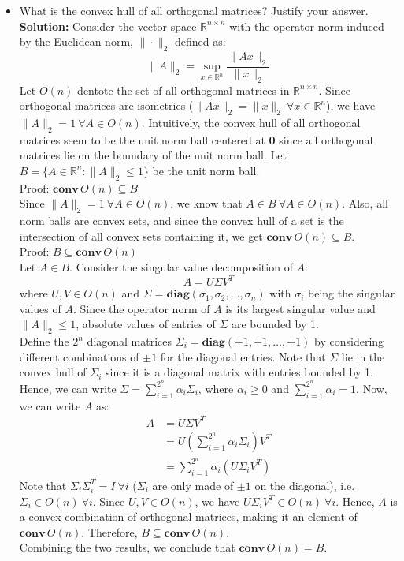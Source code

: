 \documentclass{article}
\begin{document}
\begin{itemize}
  Hence, we conclude that $\mathbf{conv} \, S = B_1$.
  
  \item[(b)] What is the convex hull of all orthogonal matrices? Justify your answer. \\
  
  \textbf{Solution:} Consider the vector space $\mathbb{R}^{n \times n}$ with the operator norm induced by the Euclidean norm, $\|\cdot\|_2$ defined as:
  \[ \|A\|_2 = \sup_{x \in \mathbb{R}^n} \frac{\|Ax\|_2}{\|x\|_2} \]
  Let $O(n)$ dentote the set of all orthogonal matrices in $\mathbb{R}^{n \times n}$. Since orthogonal matrices are isometries ($\|Ax\|_2 = \|x\|_2 ~ \forall x \in \mathbb{R}^n$), we have $\|A\|_2 = 1 ~ \forall A \in O(n)$. Intuitively, the convex hull of all orthogonal matrices seem to be the unit norm ball centered at \textbf{0} since all orthogonal matrices lie on the boundary of the unit norm ball. Let $B = \{A \in \mathbb{R}^n : \|A\|_2 \le 1\}$ be the unit norm ball. \\

  Proof: $\mathbf{conv} \, O(n) \subseteq B$ \\
  Since $\|A\|_2 = 1 ~ \forall A \in O(n)$, we know that $A \in B ~ \forall A \in O(n)$. Also, all norm balls are convex sets, and since the convex hull of a set is the intersection of all convex sets containing it, we get $\mathbf{conv} \, O(n) \subseteq B$. \\

  Proof: $B \subseteq \mathbf{conv} \, O(n)$ \\
  Let $A \in B$. Consider the singular value decomposition of $A$:
   \[ A = U \Sigma V^T \]
   where $U, V \in O(n)$ and $\Sigma = \mathbf{diag}(\sigma_1, \sigma_2, \dots, \sigma_n)$ with $\sigma_i$ being the singular values of $A$. Since the operator norm of $A$ is its largest singular value and $\|A\|_2 \le 1$, absolute values of entries of $\Sigma$ are bounded by 1. \\
   Define the $2^n$ diagonal matrices $\Sigma_i = \mathbf{diag}(\pm 1, \pm 1, \dots, \pm 1)$ by considering different combinations of $\pm 1$ for the diagonal entries. Note that $\Sigma$ lie in the convex hull of $\Sigma_i$ since it is a diagonal matrix with entries bounded by 1. Hence, we can write $\Sigma = \sum_{i=1}^{2^n} \alpha_i \Sigma_i$, where $\alpha_i \ge 0$ and $\sum_{i=1}^{2^n} \alpha_i = 1$. Now, we can write $A$ as:
   \begin{align*}
      A &= U \Sigma V^T \\
      &= U \left(\sum_{i=1}^{2^n} \alpha_i \Sigma_i\right) V^T \\
      &= \sum_{i=1}^{2^n} \alpha_i (U \Sigma_i V^T)
   \end{align*}
   Note that $\Sigma_i \Sigma_i^T = I ~ \forall i$ ($\Sigma_i$ are only made of $\pm 1$ on the diagonal), i.e. $\Sigma_i \in O(n) ~ \forall i$. Since $U, V \in O(n)$, we have $U \Sigma_i V^T \in O(n) ~ \forall i$. Hence, $A$ is a convex combination of orthogonal matrices, making it an element of $\mathbf{conv} \, O(n)$. Therefore, $B \subseteq \mathbf{conv} \, O(n)$. \\

   Combining the two results, we conclude that $\mathbf{conv} \, O(n) = B$.
\end{itemize}
\end{document}
